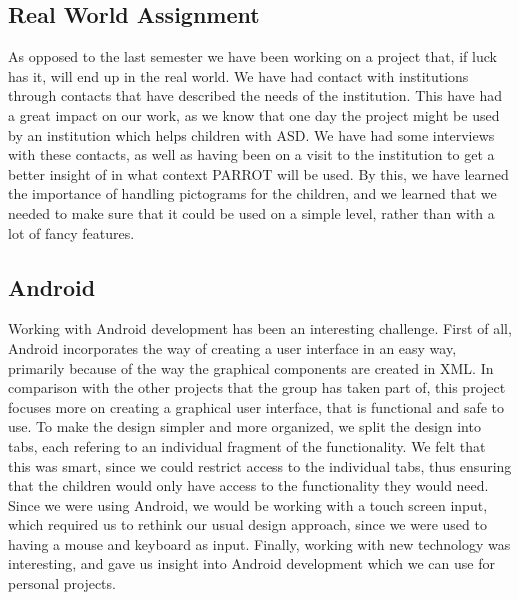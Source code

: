 \subsection*{Real World Assignment}
As opposed to the last semester we have been working on a project that, if luck has it, will end up in the real world.\newline
We have had contact with institutions through contacts that have described the needs of the institution.\newline
This have had a great impact on our work, as we know that one day the project might be used by an institution which helps children with ASD. 
We have had some interviews with these contacts, as well as having been on a visit to the institution to get a better insight of in what context PARROT will be used. 
By this, we have learned the importance of handling pictograms for the children, and we learned that we needed to make sure that it could be used on a simple level, rather than with a lot of fancy features. 



\subsection*{Android}
Working with Android development has been an interesting challenge. First of all, Android incorporates the way of creating a user interface in an easy way, primarily because of the way the graphical components are created in XML.\newline
In comparison with the other projects that the group has taken part of, this project focuses more on creating a graphical user interface, that is functional and safe to use.\newline
To make the design simpler and more organized, we split the design into tabs, each refering to an individual fragment of the functionality. We felt that this was smart, since we could restrict access to the individual tabs, thus ensuring that the children would only have access to the functionality they would need.\newline
Since we were using Android, we would be working with a touch screen input, which required us to rethink our usual design approach, since we were used to having a mouse and keyboard as input.\newline
Finally, working with new technology was interesting, and gave us insight into Android development which we can use for personal projects.